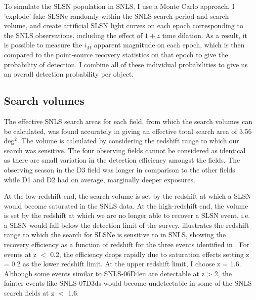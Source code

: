 To simulate the SLSN population in SNLS, I use a Monte Carlo approach. I 'explode' fake SLSNe randomly within the SNLS search period and search volume, and create artificial SLSN light curves on each epoch corresponding to the SNLS observations, including the effect of $1+z$ time dilation. As a result, it is possible to measure the $i_M$ apparent magnitude on each epoch, which is then compared to the point-source recovery statistics on that epoch to give the probability of detection. I combine all of these individual probabilities to give us an overall detection probability per object.

\subsection{Search volumes}
\label{sec:search-volumes}
The effective SNLS search areas for each field, from which the search volumes can be calculated, was found accurately in \citet{Perrett2012} giving an effective total search area of 3.56\,deg$^2$. The volume is calculated by considering the redshift range to which our search was sensitive. The four observing fields cannot be considered as identical as there are small variation in the detection efficiency amongst the fields. The observing season in the D3 field was longer in comparison to the other fields while D1 and D2 had on average, marginally deeper exposures.

At the low-redshift end, the search volume is set by the redshift at which a SLSN would become saturated in the SNLS data. At the high-redshift end, the volume is set by the redshift at which we are no longer able to recover a SLSN event, i.e. a SLSN would fall below the detection limit of the survey.  illustrates the redshift range to which the search for SLSNe is sensitive to in SNLS, showing the recovery efficiency as a function of redshift for the three events identified in . For events at z $<$ 0.2, the efficiency drops rapidly due to saturation effects setting z = 0.2 as the lower redshift limit. At the upper redshift limit, I choose z = 1.6. Although some events similar to SNLS-06D4eu are detectable at z > 2, the fainter events like SNLS-07D3ds would become undetectable in some of the SNLS search fields at z $<$ 1.6.

